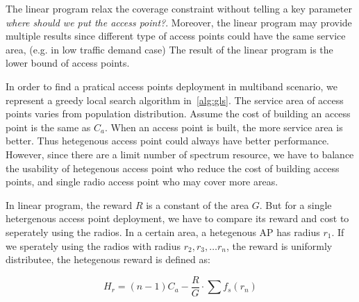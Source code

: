

The linear program relax the coverage constraint without telling a key parameter
{\it where should we put the access point?}. Moreover, the linear program may provide 
multiple results since different type of access points could have the same service area, 
(e.g. in low traffic demand case) The result of the linear program is the lower bound of 
access points. 

In order to find a pratical access points deployment in multiband scenario, we represent 
a greedy local search algorithm in~\ref{alg:gls}. The service area of access points varies 
from population distribution. Assume the cost of building an access point is the same as $C_a$. 
When an access point is built, the more service area is better. Thus hetegenous access point
could always have better performance. However, since there are a limit number of spectrum resource,
we have to balance the usability of hetegenous access point who reduce the cost of building access 
points, and single radio access point who may cover more areas.

In linear program, the reward $R$ is a constant of the area $G$. But for a single hetergenous access
point deployment, we have to compare its reward and cost to seperately using the radios.
In a certain area, a hetegenous AP has radius $r_1$. If we sperately using the radios with
radius $r_2,r_3,\dots r_n$, the reward is uniformly distributee, the hetegenous reward is defined as:

\begin{equation}
\label{eq:unitprice}
H_r=(n-1) C_a - \frac{R}{G}\cdot\sum f_s(r_n)
\end{equation}

